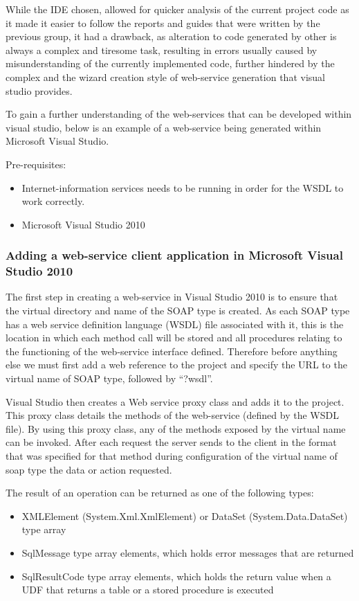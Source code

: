 While the IDE chosen, allowed for quicker analysis of the current project code as it made it easier to follow the reports and guides that were written by the previous group, it had a drawback, as alteration to code generated by other is always a complex and tiresome task, resulting in errors usually caused by misunderstanding of the currently implemented code, further hindered by the complex and the wizard creation style of web-service generation that visual studio provides.

To gain a further understanding of the web-services that can be developed within visual studio, below is an example of a web-service being generated within Microsoft Visual Studio.


Pre-requisites:
\begin{itemize}
	\item Internet-information services needs to be running in order for the WSDL to work correctly.
	
	\item Microsoft Visual Studio 2010
\end{itemize}

\subsubsection{Adding a web-service client application in Microsoft Visual Studio 2010}
The first step in creating a web-service in Visual Studio 2010 is to ensure that  the virtual directory and name of the SOAP type is created. As each SOAP type has a web service definition language (WSDL) file associated with it, this is the location in which each method call will be stored and all procedures relating to the functioning of the web-service interface defined. 
Therefore before anything else we must first add a web reference to the project and specify the URL to the virtual name of SOAP type, followed by ``?wsdl''. 

Visual Studio then creates a Web service proxy class and adds it to the project. This proxy class details the methods of the web-service (defined by the WSDL file). By using this proxy class, any of the methods exposed by the virtual name can be invoked. After each request the server sends to the client in the format that was specified for that method during configuration of the virtual name of soap type the data or action requested.

The result of an operation can be returned  as one of the following types: 
\begin{itemize}
	\item XMLElement (System.Xml.XmlElement) or DataSet (System.Data.DataSet) type array 
	
	\item SqlMessage type array elements, which holds error messages that are returned
	
	\item SqlResultCode type array elements, which holds the return value when a UDF that returns a table or a stored procedure is executed 
\end{itemize}

